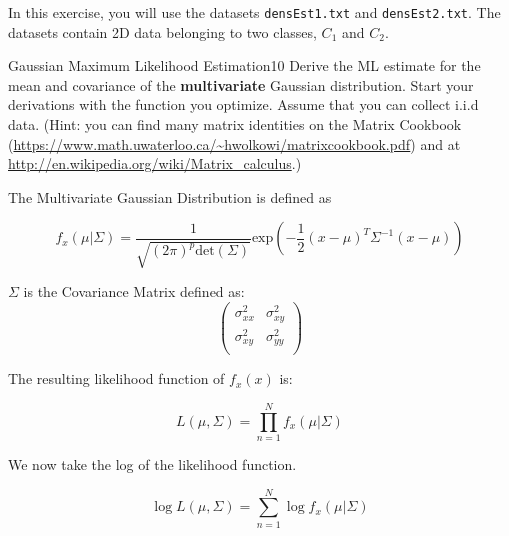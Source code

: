 \newif\ifvimbug
\vimbugfalse

\ifvimbug

\fi

In this exercise, you will use the datasets \texttt{densEst1.txt} 
and \texttt{densEst2.txt}. The datasets contain 2D data belonging
to two classes, $C_1$ and $C_2$.

\begin{questions}


\begin{question}{Gaussian Maximum Likelihood Estimation}{10}
Derive the ML estimate for the mean and covariance of the \textbf{multivariate} Gaussian distribution. Start your derivations with the function you optimize. Assume that you can collect i.i.d data. (Hint: you can find many matrix identities on the Matrix Cookbook (\url{https://www.math.uwaterloo.ca/~hwolkowi/matrixcookbook.pdf}) and at \url{http://en.wikipedia.org/wiki/Matrix_calculus}.)

\begin{answer}
The Multivariate Gaussian Distribution is defined as

\begin{equation}
	f_x(\mu|\Sigma) = \frac{1}{\sqrt{(2\pi)^p \text{det}(\Sigma)}} \text{exp} (-\frac{1}{2}(x-\mu)^T \Sigma^{-1} (x-\mu))
\end{equation}

$\Sigma$ is the Covariance Matrix defined as:
\begin{equation}
\begin{pmatrix}
	\sigma_{xx}^2 & \sigma_{xy}^2 \\
	\sigma_{xy}^2 & \sigma_{yy}^2 \\
\end{pmatrix}
\end{equation}

The resulting likelihood function of $f_x(x)$ is:

\begin{equation}
L(\mu, \Sigma) = \prod\limits_{n=1}^{N} f_x(\mu|\Sigma)
\end{equation}

We now take the log of the likelihood function.

\begin{equation}
	\log L(\mu, \Sigma) = \sum_{n=1}^{N} \log f_x(\mu|\Sigma)
\end{equation}


\end{answer}
\end{question}
\end{questions}
